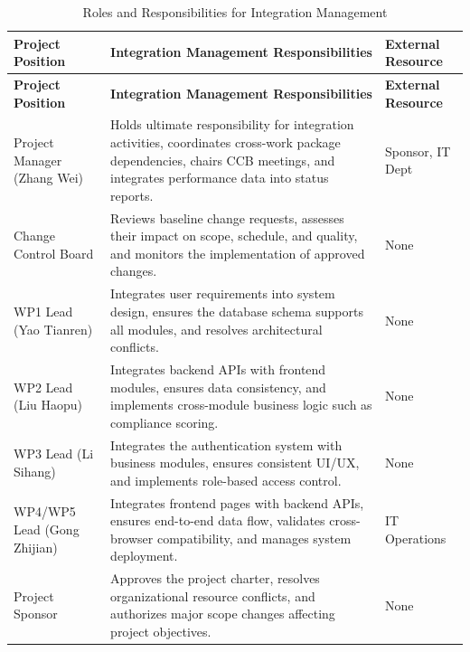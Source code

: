 \documentclass[12pt,a4paper]{article}
\begin{document}
{\footnotesize
\begin{longtable}{@{}>{\raggedright\arraybackslash}p{4.5cm} >{\raggedright\arraybackslash}p{7cm} >{\raggedright\arraybackslash}p{2.5cm}@{}}
\caption{Roles and Responsibilities for Integration Management}\label{tab:roles}\\
\toprule
\textbf{Project Position} & \textbf{Integration Management Responsibilities} & \textbf{External Resource} \\
\midrule
\endfirsthead
\toprule
\textbf{Project Position} & \textbf{Integration Management Responsibilities} & \textbf{External Resource} \\
\midrule
\endhead
Project Manager (Zhang Wei) & Holds ultimate responsibility for integration activities, coordinates cross-work package dependencies, chairs CCB meetings, and integrates performance data into status reports. & Sponsor, IT Dept \\
\addlinespace
Change Control Board & Reviews baseline change requests, assesses their impact on scope, schedule, and quality, and monitors the implementation of approved changes. & None \\
\addlinespace
WP1 Lead (Yao Tianren) & Integrates user requirements into system design, ensures the database schema supports all modules, and resolves architectural conflicts. & None \\
\addlinespace
WP2 Lead (Liu Haopu) & Integrates backend APIs with frontend modules, ensures data consistency, and implements cross-module business logic such as compliance scoring. & None \\
\addlinespace
WP3 Lead (Li Sihang) & Integrates the authentication system with business modules, ensures consistent UI/UX, and implements role-based access control. & None \\
\addlinespace
WP4/WP5 Lead (Gong Zhijian) & Integrates frontend pages with backend APIs, ensures end-to-end data flow, validates cross-browser compatibility, and manages system deployment. & IT Operations \\
\addlinespace
Project Sponsor & Approves the project charter, resolves organizational resource conflicts, and authorizes major scope changes affecting project objectives. & None \\
\bottomrule
\end{longtable}
}
\end{document}
